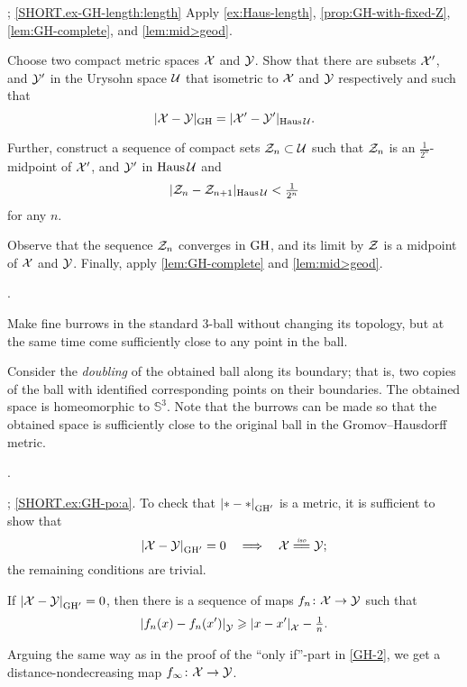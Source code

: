 \parbf{\ref{ex-GH-length}}; \ref{SHORT.ex-GH-length:length}
Apply
\ref{ex:Haus-length},
\ref{prop:GH-with-fixed-Z},
\ref{lem:GH-complete},
and \ref{lem:mid>geod}.

Choose two compact metric spaces $\mathcal{X}$ and $\mathcal{Y}$.
Show that there are subsets $\mathcal{X}'$, and $\mathcal{Y}'$ in the Urysohn space $\mathcal{U}$ that isometric to $\mathcal{X}$ and $\mathcal{Y}$ respectively and such that 
\[|\mathcal{X}-\mathcal{Y}|_{\operatorname{\rm GH}\nolimits} = |\mathcal{X}'-\mathcal{Y}'|_{\operatorname{\rm Haus}\nolimits\mathcal{U}}.\]

Further, construct a sequence of compact sets $\mathcal{Z}_n\subset \mathcal{U}$ such that $\mathcal{Z}_n$ is an $\tfrac1{2^n}$-midpoint of $\mathcal{X}'$, and $\mathcal{Y}'$ in $\operatorname{\rm Haus}\nolimits\mathcal{U}$ and 
\[|\mathcal{Z}_n-\mathcal{Z}_{n+1}|_{\operatorname{\rm Haus}\nolimits\mathcal{U}}<\tfrac1{2^n}\]
for any $n$.

Observe that the sequence $\mathcal{Z}_n$ converges in $\operatorname{\rm GH}\nolimits$, and its limit by $\mathcal{Z}$ is a midpoint of $\mathcal{X}$ and $\mathcal{Y}$.
Finally, apply \ref{lem:GH-complete} and \ref{lem:mid>geod}.

 \cite{ivanov-nikolaeva-tuzhilin}.



Make fine burrows in the standard 3-ball without changing its topology,
but at the same time come sufficiently close to any point in the ball.

Consider the \emph{doubling} of the obtained ball along its boundary;
that is, two copies of the ball with identified corresponding points on their boundaries.
The obtained space is homeomorphic to $\mathbb{S}^3$.
Note that the burrows can be made 
so that the obtained space is sufficiently close to the original ball 
in the Gromov--Hausdorff metric.

 \cite[Exercises 7.5.13 and 7.5.17]{burago-burago-ivanov}. 

\parbf{\ref{ex:GH-po}}; \ref{SHORT.ex:GH-po:a}.
To check that $\dist{*}{*}{\GH'}$ is a metric, it is sufficient to show that
\[\dist{\spc{X}}{\spc{Y}}{\GH'}=0 
\quad\Longrightarrow\quad
\spc{X}\iso\spc{Y};\]
the remaining conditions are trivial.

If $\dist{\spc{X}}{\spc{Y}}{\GH'}=0$, then there is a sequence of maps $f_n\colon\mathcal{X}\to \mathcal{Y}$ such that 
\[\dist{f_n(x)}{f_n(x')}{\spc{Y}}\ge \dist{x}{x'}{\spc{X}}-\tfrac1n.\]

Arguing the same way as in the proof of the ``only if''-part in \ref{GH-2},
we get a distance-nondecreasing map $f_\infty\colon\mathcal{X}\to \mathcal{Y}$.

